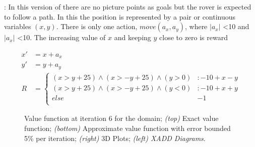 \MarsRoverBi: In this version of \MarsRover there are no picture points as goals but the rover is expected to follow a path. In this the position is represented by a pair or continuous variables $(x,y)$. There is only one action, $move(a_x,a_y)$, where $|a_x|$ <10 and $|a_x|$ <10. The increasing value of $x$ and keeping $y$ close to zero is reward 

{\footnotesize
\begin{align*}
x' &= x +a_x\\
y' &= y +a_y\\
R & = \begin{cases}
(x > y +25) \wedge (x > - y  +25) \wedge (y >0) &: -10 + x -y\\
(x > y +25) \wedge (x > - y  +25) \wedge (y <0) &: -10 + x +y\\
else & -1\\
\end{cases}
\end{align*}}

\begin{figure}[tbp!]
\centering
{}
\caption {\footnotesize
	Value function at iteration 6 for the \MarsRoverBi domain;
	{\it (top)} Exact value function; 	{\it (bottom)} Approximate value function with error bounded 5\% per iteration;
	{\it (right)} 3D Plots; {\it (left) XADD Diagrams}.
}
\label{fig:Mars2DV6}
\vspace{-5mm}
\end{figure}

